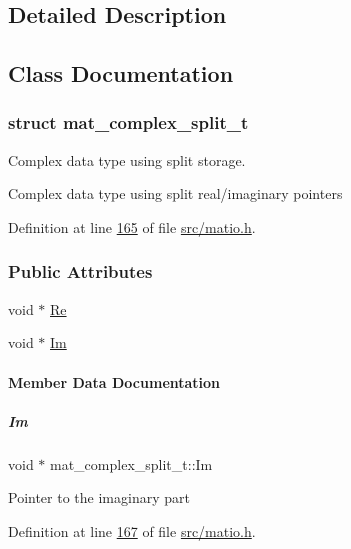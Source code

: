 \subsection{Detailed Description}


\subsection{Class Documentation}
\label{structmat__complex__split__t}
\subsubsection{struct mat\+\_\+complex\+\_\+split\+\_\+t}
Complex data type using split storage. 

Complex data type using split real/imaginary pointers 

Definition at line \hyperlink{src_2matio_8h_source_l00165}{165} of file \hyperlink{src_2matio_8h_source}{src/matio.\+h}.

\subsubsection*{Public Attributes}
\begin{DoxyCompactItemize}
\item 
void $\ast$ \hyperlink{group___m_a_t_a484a93607508adac2bce53a0252e0325}{Re}
\item 
void $\ast$ \hyperlink{group___m_a_t_a7182d10b0d3598415887376065440946}{Im}
\end{DoxyCompactItemize}


\paragraph{Member Data Documentation}
\mbox{\label{group___m_a_t_a7182d10b0d3598415887376065440946}} 
\subparagraph{\texorpdfstring{Im}{Im}}
{\footnotesize\ttfamily void $\ast$ mat\+\_\+complex\+\_\+split\+\_\+t\+::\+Im}

Pointer to the imaginary part 

Definition at line \hyperlink{src_2matio_8h_source_l00167}{167} of file \hyperlink{src_2matio_8h_source}{src/matio.\+h}.

